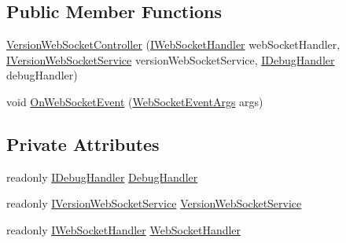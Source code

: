 \subsection*{Public Member Functions}
\begin{DoxyCompactItemize}
\item 
\mbox{\hyperlink{class_little_weeb_library_1_1_controllers_1_1_sub_controllers_1_1_version_web_socket_controller_a8c030dabf1c19d49efa902ef97a84f7a}{Version\+Web\+Socket\+Controller}} (\mbox{\hyperlink{interface_little_weeb_library_1_1_handlers_1_1_i_web_socket_handler}{I\+Web\+Socket\+Handler}} web\+Socket\+Handler, \mbox{\hyperlink{interface_little_weeb_library_1_1_services_1_1_i_version_web_socket_service}{I\+Version\+Web\+Socket\+Service}} version\+Web\+Socket\+Service, \mbox{\hyperlink{interface_little_weeb_library_1_1_handlers_1_1_i_debug_handler}{I\+Debug\+Handler}} debug\+Handler)
\item 
void \mbox{\hyperlink{class_little_weeb_library_1_1_controllers_1_1_sub_controllers_1_1_version_web_socket_controller_aecbfb94508db51693b11ea8dba9cf7e9}{On\+Web\+Socket\+Event}} (\mbox{\hyperlink{class_little_weeb_library_1_1_event_arguments_1_1_web_socket_event_args}{Web\+Socket\+Event\+Args}} args)
\end{DoxyCompactItemize}
\subsection*{Private Attributes}
\begin{DoxyCompactItemize}
\item 
readonly \mbox{\hyperlink{interface_little_weeb_library_1_1_handlers_1_1_i_debug_handler}{I\+Debug\+Handler}} \mbox{\hyperlink{class_little_weeb_library_1_1_controllers_1_1_sub_controllers_1_1_version_web_socket_controller_a24e591facb6cdbd59b1dc2fdd176097b}{Debug\+Handler}}
\item 
readonly \mbox{\hyperlink{interface_little_weeb_library_1_1_services_1_1_i_version_web_socket_service}{I\+Version\+Web\+Socket\+Service}} \mbox{\hyperlink{class_little_weeb_library_1_1_controllers_1_1_sub_controllers_1_1_version_web_socket_controller_ace430a42e0ff93f1e4476abefc14e6e9}{Version\+Web\+Socket\+Service}}
\item 
readonly \mbox{\hyperlink{interface_little_weeb_library_1_1_handlers_1_1_i_web_socket_handler}{I\+Web\+Socket\+Handler}} \mbox{\hyperlink{class_little_weeb_library_1_1_controllers_1_1_sub_controllers_1_1_version_web_socket_controller_a81dd482a3c1356e21cd2b6e7b1de4812}{Web\+Socket\+Handler}}
\end{DoxyCompactItemize}


